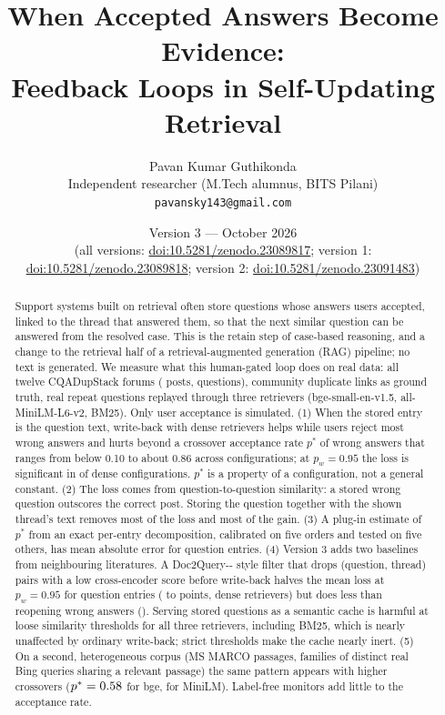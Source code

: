 \documentclass[11pt]{article}
\title{When Accepted Answers Become Evidence:\\Feedback Loops in Self-Updating Retrieval}
\author{Pavan Kumar Guthikonda\\
\small Independent researcher (M.Tech alumnus, BITS Pilani)\\
\small \texttt{pavansky143@gmail.com}}
\date{Version 3 --- October 2026\\\small (all versions: \href{https://doi.org/10.5281/zenodo.23089817}{doi:10.5281/zenodo.23089817}; version 1: \href{https://doi.org/10.5281/zenodo.23089818}{doi:10.5281/zenodo.23089818}; version 2: \href{https://doi.org/10.5281/zenodo.23091483}{doi:10.5281/zenodo.23091483})}
\begin{document}
\maketitle

\begin{abstract}
Support systems built on retrieval often store questions whose answers users accepted, linked to the thread that answered them, so that the next similar question can be answered from the resolved case. This is the retain step of case-based reasoning, and a change to the retrieval half of a retrieval-augmented generation (RAG) pipeline; no text is generated. We measure what this human-gated loop does on real data: all twelve CQADupStack forums (\totKB{} posts, \totAsks{} questions), community duplicate links as ground truth, real repeat questions replayed through three retrievers (bge-small-en-v1.5, all-MiniLM-L6-v2, BM25). Only user acceptance is simulated. (1) When the stored entry is the question text, write-back with dense retrievers helps while users reject most wrong answers and hurts beyond a crossover acceptance rate $p^*$ of wrong answers that ranges from below 0.10 to about 0.86 across configurations; at $p_w=0.95$ the loss is significant in \negNF{} of \nDense{} dense configurations. $p^*$ is a property of a configuration, not a general constant. (2) The loss comes from question-to-question similarity: a stored wrong question outscores the correct post. Storing the question together with the shown thread's text removes most of the loss and most of the gain. (3) A plug-in estimate of $p^*$ from an exact per-entry decomposition, calibrated on five orders and tested on five others, has mean absolute error \oosMAEAskTh{} for question entries. (4) Version 3 adds two baselines from neighbouring literatures. A Doc2Query-{}-{} style filter that drops (question, thread) pairs with a low cross-encoder score before write-back halves the mean loss at $p_w=0.95$ for question entries (\tFAskNaive{} to \tFAskFltH{} points, dense retrievers) but does less than reopening wrong answers (\tFAskDem). Serving stored questions as a semantic cache is harmful at loose similarity thresholds for all three retrievers, including BM25, which is nearly unaffected by ordinary write-back; strict thresholds make the cache nearly inert. (5) On a second, heterogeneous corpus (MS MARCO passages, \hFam{} families of distinct real Bing queries sharing a relevant passage) the same pattern appears with higher crossovers ($p^*=0.58$ for bge, \hPMiniAsk{} for MiniLM). Label-free monitors add little to the acceptance rate.
\end{abstract}
\end{document}
